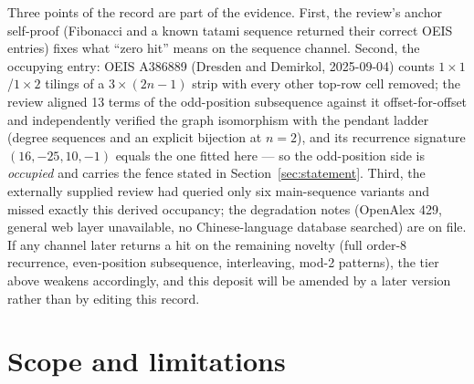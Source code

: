 \documentclass[11pt]{article}
\theoremstyle{definition}
\begin{document}
Three points of the record are part of the evidence. First, the review's anchor
self-proof (Fibonacci and a known tatami sequence returned their correct OEIS
entries) fixes what ``zero hit'' means on the sequence channel. Second, the
occupying entry: OEIS A386889 (Dresden and Demirkol, 2025-09-04) counts
$1\times1$/$1\times2$ tilings of a $3\times(2n-1)$ strip with every other
top-row cell removed; the review aligned 13 terms of the odd-position
subsequence against it offset-for-offset and independently verified the graph
isomorphism with the pendant ladder (degree sequences and an explicit bijection
at $n=2$), and its recurrence signature $(16,-25,10,-1)$ equals the one fitted
here --- so the odd-position side is \emph{occupied} and carries the fence
stated in Section~\ref{sec:statement}. Third, the externally supplied review
had queried only six main-sequence variants and missed exactly this derived
occupancy; the degradation notes (OpenAlex 429, general web layer unavailable,
no Chinese-language database searched) are on file. If any channel later
returns a hit on the remaining novelty (full order-$8$ recurrence,
even-position subsequence, interleaving, mod-2 patterns), the tier above
weakens accordingly, and this deposit will be amended by a later version rather
than by editing this record.

\section{Scope and limitations}
\end{document}
